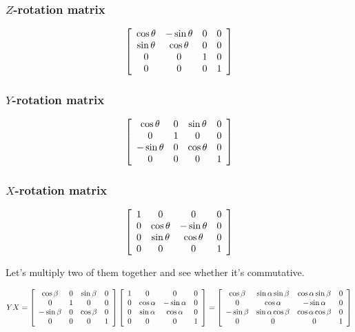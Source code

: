 \documentclass[11pt]{article}
\begin{document}
\begin{spacing}{1.2}
\subsubsection{$Z$-rotation matrix}

$$
\left[
\begin{array}{cccc}
	\cos \theta & - \sin \theta & 0 & 0 \cr
	\sin \theta & \cos \theta & 0 & 0 \cr
	0 & 0 & 1 & 0 \cr
	0 & 0 & 0 & 1 \cr
\end{array}
\right]
$$

\subsubsection{$Y$-rotation matrix}

$$
\left[
\begin{array}{cccc}
	\cos \theta & 0 & \sin \theta & 0 \cr
	0 & 1 & 0 & 0 \cr
	-\sin \theta & 0  & \cos \theta & 0 \cr
	0 & 0 & 0 & 1 \cr
\end{array}
\right]
$$

\subsubsection{$X$-rotation matrix}

$$
\left[
\begin{array}{cccc}
	1 & 0 & 0 & 0 \cr
	0 & \cos \theta & -\sin \theta & 0 \cr
	0 & \sin \theta & \cos \theta & 0 \cr
	0 & 0 & 0 & 1 \cr
\end{array}
\right]
$$

Let's multiply two of them together and see whether it's commutative.  

$$YX = 
\left[
\begin{array}{cccc}
	\cos \beta & 0 & \sin \beta & 0 \cr
	0 & 1 & 0 & 0 \cr
	-\sin \beta & 0  & \cos \beta & 0 \cr
	0 & 0 & 0 & 1 \cr
\end{array}
\right]
\left[
\begin{array}{cccc}
	1 & 0 & 0 & 0 \cr
	0 & \cos \alpha & -\sin \alpha & 0 \cr
	0 & \sin \alpha & \cos \alpha & 0 \cr
	0 & 0 & 0 & 1 \cr
\end{array}
\right]
=\left[
\begin{array}{cccc}
	\cos \beta & \sin \alpha \sin \beta & \cos \alpha \sin \beta & 0 \cr
	0 & \cos \alpha & -\sin \alpha & 0 \cr
	-\sin \beta & \sin \alpha \cos \beta & \cos \alpha \cos \beta & 0 \cr
	0 & 0 & 0 & 1 \cr
\end{array}
\right]
$$


\end{spacing}
\end{document}
